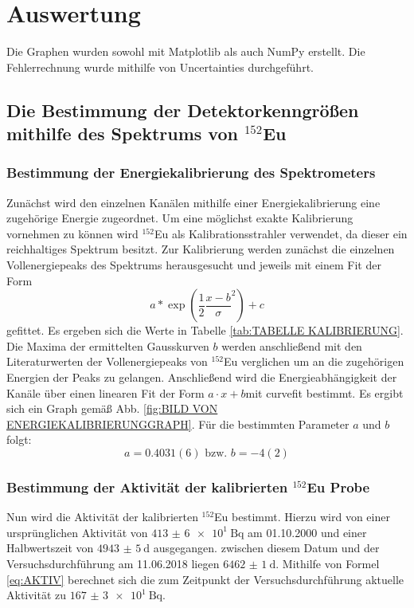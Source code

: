\section{Auswertung}
\label{sec:Auswertung}
Die Graphen wurden sowohl mit Matplotlib \cite{matplotlib} als auch NumPy \cite{numpy} erstellt. Die
Fehlerrechnung wurde mithilfe von Uncertainties \cite{uncertainties} durchgeführt.
\subsection{Die Bestimmung der Detektorkenngrößen mithilfe des Spektrums von $^{152}$Eu} 
\subsubsection{Bestimmung der Energiekalibrierung des Spektrometers}
Zunächst wird den einzelnen Kanälen mithilfe einer Energiekalibrierung eine zugehörige Energie zugeordnet. Um eine möglichst exakte Kalibrierung vornehmen zu können wird $^{152}$Eu als Kalibrationsstrahler verwendet, da dieser ein reichhaltiges Spektrum besitzt. Zur Kalibrierung werden zunächst die einzelnen Vollenergiepeaks des Spektrums herausgesucht und jeweils mit einem Fit der Form
\begin{equation}
    a * \exp(\frac{1}{2} \frac{x-b}{\sigma}^2) +c
\end{equation}
gefittet. Es ergeben sich die Werte in Tabelle \ref{tab:TABELLE KALIBRIERUNG}. Die Maxima der ermittelten Gausskurven $b$ werden anschließend mit den Literaturwerten der Vollenergiepeaks von $^{152}$Eu\cite{Eu152} verglichen um an die zugehörigen Energien der Peaks zu gelangen. Anschließend wird die Energieabhängigkeit der Kanäle über einen linearen Fit der Form $a \cdot x+b $mit curvefit \cite{scipy} bestimmt. Es ergibt sich ein Graph gemäß Abb. \ref{fig:BILD VON ENERGIEKALIBRIERUNGGRAPH}. Für die bestimmten Parameter $a$ und $b$ folgt:
\begin{equation}
a = \si{0.4031(6)} \text{ bzw. } b = \si{-4(2)}
\end{equation}

\subsubsection{Bestimmung der Aktivität der kalibrierten $^{152}$Eu Probe}
Nun wird die Aktivität der kalibrierten $^{152}$Eu bestimmt. Hierzu wird von einer ursprünglichen Aktivität von $\SI{413(6)e1}{\becquerel}$ am 01.10.2000 und einer Halbwertszeit von $\SI{4943(5)}{\day}$ \cite{V18} ausgegangen. zwischen diesem Datum und der Versuchsdurchführung am 11.06.2018 liegen $\SI{6462(1)}{\day}$. Mithilfe von Formel \ref{eq:AKTIV} berechnet sich die zum Zeitpunkt der Versuchsdurchführung aktuelle Aktivität zu $\SI{167(3)e1}{\becquerel}$.
